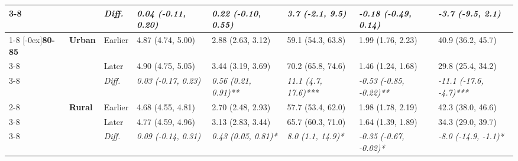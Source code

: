 \documentclass[12pt, a4paper]{article}
\begin{document}
\begin{appendices}
\begin{table}[!p]
{\begin{tabular}[t]{>{}l>{}lllllll}
        \cmidrule{3-8}
                                              &                                 & \cellcolor{gray!10}\em{Diff.} & \cellcolor{gray!10}\em{0.04 (-0.11, 0.20)}  & \cellcolor{gray!10}\em{0.22 (-0.10, 0.55)}   & \cellcolor{gray!10}\em{3.7 (-2.1, 9.5)}     & \cellcolor{gray!10}\em{-0.18 (-0.49, 0.14)}    & \cellcolor{gray!10}\em{-3.7 (-9.5, 2.1)}       \\
        \cmidrule{1-8}
        \multirow{9}{*}[-0ex]{\textbf{80-85}} & \multirow{3}{*}{\textbf{Urban}} & Earlier                       & 4.87 (4.74, 5.00)                           & 2.88 (2.63, 3.12)                            & 59.1 (54.3, 63.8)                           & 1.99 (1.76, 2.23)                              & 40.9 (36.2, 45.7)                              \\
        \cmidrule{3-8}
                                              &                                 & Later                         & 4.90 (4.75, 5.05)                           & 3.44 (3.19, 3.69)                            & 70.2 (65.8, 74.6)                           & 1.46 (1.24, 1.68)                              & 29.8 (25.4, 34.2)                              \\
        \cmidrule{3-8}
                                              &                                 & \cellcolor{gray!10}\em{Diff.} & \cellcolor{gray!10}\em{0.03 (-0.17, 0.23)}  & \cellcolor{gray!10}\em{0.56 (0.21, 0.91)**}  & \cellcolor{gray!10}\em{11.1 (4.7, 17.6)***} & \cellcolor{gray!10}\em{-0.53 (-0.85, -0.22)**} & \cellcolor{gray!10}\em{-11.1 (-17.6, -4.7)***} \\
        \cmidrule{2-8}
                                              & \multirow{3}{*}{\textbf{Rural}} & Earlier                       & 4.68 (4.55, 4.81)                           & 2.70 (2.48, 2.93)                            & 57.7 (53.4, 62.0)                           & 1.98 (1.78, 2.19)                              & 42.3 (38.0, 46.6)                              \\
        \cmidrule{3-8}
                                              &                                 & Later                         & 4.77 (4.59, 4.96)                           & 3.13 (2.83, 3.44)                            & 65.7 (60.3, 71.0)                           & 1.64 (1.39, 1.89)                              & 34.3 (29.0, 39.7)                              \\
        \cmidrule{3-8}
                                              &                                 & \cellcolor{gray!10}\em{Diff.} & \cellcolor{gray!10}\em{0.09 (-0.14, 0.31)}  & \cellcolor{gray!10}\em{0.43 (0.05, 0.81)*}   & \cellcolor{gray!10}\em{8.0 (1.1, 14.9)*}    & \cellcolor{gray!10}\em{-0.35 (-0.67, -0.02)*}  & \cellcolor{gray!10}\em{-8.0 (-14.9, -1.1)*}    \\

\end{tabular}}
\end{table}
\end{appendices}
\end{document}
